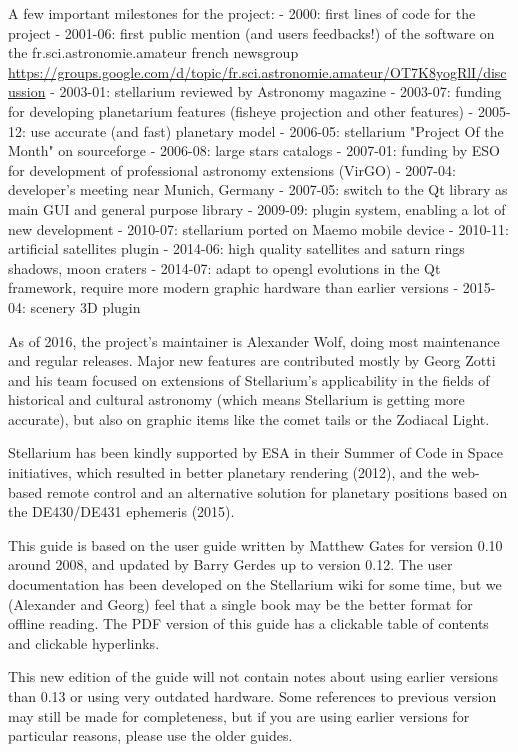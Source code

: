 A few important milestones for the project:
 - 2000: first lines of code for the project
 - 2001-06: first public mention (and users feedbacks!) of the software on the fr.sci.astronomie.amateur french newsgroup \url{https://groups.google.com/d/topic/fr.sci.astronomie.amateur/OT7K8yogRlI/discussion}
 - 2003-01: stellarium reviewed by Astronomy magazine
 - 2003-07: funding for developing planetarium features (fisheye projection and other features)
 - 2005-12: use accurate (and fast) planetary model
 - 2006-05: stellarium "Project Of the Month" on sourceforge
 - 2006-08: large stars catalogs
 - 2007-01: funding by ESO for development of professional astronomy extensions (VirGO)
 - 2007-04: developer's meeting near Munich, Germany
 - 2007-05: switch to the Qt library as main GUI and general purpose library
 - 2009-09: plugin system, enabling a lot of new development
 - 2010-07: stellarium ported on Maemo mobile device
 - 2010-11: artificial satellites plugin
 - 2014-06: high quality satellites and saturn rings shadows, moon craters
 - 2014-07: adapt to opengl evolutions in the Qt framework, require more modern graphic hardware than earlier versions
 - 2015-04: scenery 3D plugin

As of 2016, the project's maintainer is Alexander Wolf, doing most maintenance
and regular releases. Major new features are contributed mostly by Georg Zotti
and his team focused on extensions of Stellarium's applicability in the fields of
historical and cultural astronomy (which means Stellarium is getting more
accurate), but also on graphic items like the comet tails or the Zodiacal Light.


Stellarium has been kindly supported by ESA in their Summer of Code in
Space initiatives, which resulted in better planetary rendering
(2012), and the web-based remote control and an alternative solution
for planetary positions based on the DE430/DE431 ephemeris (2015).


This guide is based on the user guide written by Matthew Gates for
version 0.10 around 2008, and updated by Barry Gerdes up to version
0.12. %
The user documentation has been developed on the Stellarium wiki for
some time, but we (Alexander and Georg) feel that a single book may
be the better format for offline reading. The PDF version of this 
guide has a clickable table of contents and clickable hyperlinks.

This new edition of the guide will not contain notes about using
earlier versions than 0.13 or using very outdated hardware. Some
references to previous version may still be made for completeness, 
but if you are using earlier versions
for particular reasons, please use the older guides.

